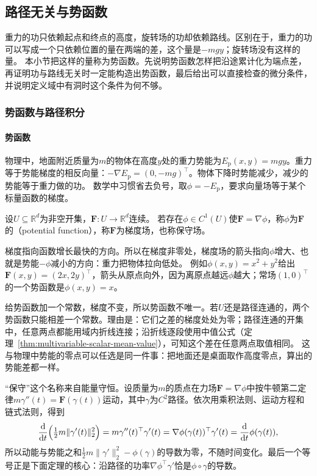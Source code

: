\subsection{路径无关与势函数}
\label{sec:multivariable-potential-path-independence}

重力的功只依赖起点和终点的高度，旋转场的功却依赖路线。区别在于，重力的功可以写成一个只依赖位置的量在两端的差，这个量是$-mgy$；旋转场没有这样的量。
本小节把这样的量称为势函数。先说明势函数怎样把沿途累计化为端点差，再证明功与路线无关时一定能构造出势函数，最后给出可以直接检查的微分条件，并说明定义域中有洞时这个条件为何不够。

\subsubsection{势函数与路径积分}

\paragraph{势函数}

物理中，地面附近质量为$m$的物体在高度$y$处的重力势能为$E_{\mathrm p}(x,y)=mgy$。重力等于势能梯度的相反向量：$-\nabla E_{\mathrm p}=(0,-mg)^\top$。物体下降时势能减少，减少的势能等于重力做的功。
数学中习惯省去负号，取$\phi=-E_{\mathrm p}$，要求向量场等于某个标量函数的梯度。
\begin{definition}[势函数]
设$U\subseteq\mathbb R^d$为非空开集，$\bm F:U\to\mathbb R^d$连续。
若存在$\phi\in C^1(U)$使$\bm F=\nabla\phi$，称$\phi$为$\bm F$的（potential function），称$\bm F$为梯度场，也称保守场。
\end{definition}

梯度指向函数增长最快的方向。所以在梯度非零处，梯度场的箭头指向$\phi$增大、也就是势能$-\phi$减小的方向：重力把物体拉向低处。
例如$\phi(x,y)=x^2+y^2$给出$\bm F(x,y)=(2x,2y)^\top$，箭头从原点向外，因为离原点越远$\phi$越大；常场$(1,0)^\top$的一个势函数是$\phi(x,y)=x$。

给势函数加一个常数，梯度不变，所以势函数不唯一。若$U$还是路径连通的，两个势函数只能相差一个常数。理由是：它们之差的梯度处处为零；路径连通的开集中，任意两点都能用域内折线连接；沿折线逐段使用中值公式（定理~\ref{thm:multivariable-scalar-mean-value}），可知这个差在任意两点取值相同。
这与物理中势能的零点可以任选是同一件事：把地面还是桌面取作高度零点，算出的势能差都一样。

“保守”这个名称来自能量守恒。设质量为$m$的质点在力场$\bm F=\nabla\phi$中按牛顿第二定律$m\gamma''(t)=\bm F(\gamma(t))$运动，其中$\gamma$为$C^2$路径。依次用乘积法则、运动方程和链式法则，得到
\[
 \frac{\mathrm d}{\mathrm dt}\Bigl(\tfrac12m\lVert\gamma'(t)\rVert_2^2\Bigr)
 =m\gamma''(t)^\top\gamma'(t)=\nabla\phi(\gamma(t))^\top\gamma'(t)
 =\frac{\mathrm d}{\mathrm dt}\phi(\gamma(t)),
\]
所以动能与势能之和$\frac12m\lVert\gamma'\rVert_2^2-\phi(\gamma)$的导数为零，不随时间变化。最后一个等号正是下面定理的核心：沿路径的功率$\nabla\phi^\top\gamma'$恰是$\phi\circ\gamma$的导数。

